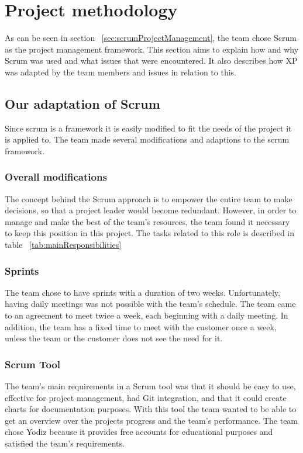 \section{Project methodology}

\label{sec:scrumDevProcess}
As can be seen in section ~\ref{sec:scrumProjectManagement}, the team chose Scrum as the project management framework. This section aims to explain how and why Scrum was used and what issues that were encountered. It also describes how XP was adapted by the team members and issues in relation to this.

\subsection{Our adaptation of Scrum}
Since scrum is a framework it is easily modified to fit the needs of the project it is applied to. The team made several modifications and adaptions to the scrum framework. 

\subsubsection{Overall modifications}
The concept behind the Scrum approach is to empower the entire team to make decisions, so that a project leader would become redundant. However, in order to manage and make the best of the team's resources, the team found it necessary to keep this position in this project. The tasks related to this role is described in table ~\ref{tab:mainResponsibilities}

\subsubsection{Sprints}
The team chose to have sprints with a duration of two weeks. Unfortunately, having daily meetings was not possible with the team's schedule. The team came to an agreement to meet twice a week, each beginning with a daily meeting. In addition, the team has a fixed time to meet with the customer once a week, unless the team or the customer does not see the need for it.

\subsubsection{Scrum Tool}
The team's main requirements in a Scrum tool was that it should be easy to use, effective for project management, had Git integration, and that it could create charts for documentation purposes. With this tool the team wanted to be able to get an overview over the projects progress and the team's performance. The team chose Yodiz \cite{yodiz} because it provides free accounts for educational purposes and satisfied the team's requirements.


